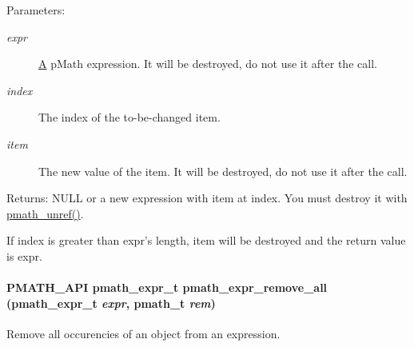 \begin{Desc}
\item[Parameters:]
\begin{description}
\item[{\em expr}]\hyperlink{class_a}{A} pMath expression. It will be destroyed, do not use it after the call. \item[{\em index}]The index of the to-be-changed item. \item[{\em item}]The new value of the item. It will be destroyed, do not use it after the call. \end{description}
\end{Desc}
\begin{Desc}
\item[Returns:]NULL or a new expression with item at index. You must destroy it with \hyperlink{classpmath__t_54e905402c38940687033b87eb8c6c9f}{pmath\_\-unref()}.\end{Desc}
If index is greater than expr's length, item will be destroyed and the return value is expr. \hypertarget{group__expressions_g639d7a67fe8b892667b00acc2504b474}{
\paragraph[{pmath\_\-expr\_\-remove\_\-all}]{\setlength{\rightskip}{0pt plus 5cm}PMATH\_\-API {\bf pmath\_\-expr\_\-t} pmath\_\-expr\_\-remove\_\-all ({\bf pmath\_\-expr\_\-t} {\em expr}, \/  {\bf pmath\_\-t} {\em rem})}\hfill}
\label{group__expressions_g639d7a67fe8b892667b00acc2504b474}


Remove all occurencies of an object from an expression. 

